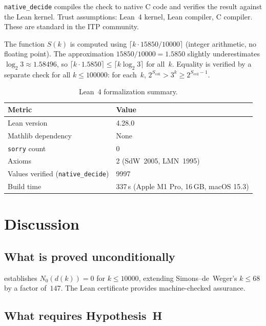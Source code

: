 \documentclass[11pt, a4paper]{amsart}
\theoremstyle{plain}
\theoremstyle{definition}
\theoremstyle{remark}
\begin{document}
\texttt{native\_decide} compiles the check to native C code
and verifies the result against the Lean kernel.
Trust assumptions: Lean~4 kernel, Lean compiler, C compiler.
These are standard in the ITP community.

The function $S(k)$ is computed using
$\lceil k \cdot 15850 / 10000 \rceil$ (integer arithmetic,
no floating point).  The approximation
$15850/10000 = 1.5850$ slightly underestimates
$\log_2 3 \approx 1.58496$, so
$\lceil k \cdot 1.5850 \rceil \leq \lceil k \log_2 3 \rceil$
for all~$k$.  Equality is verified by a separate check
for all $k \leq 100000$: for each~$k$,
$2^{S_{\text{ceil}}} > 3^k \geq 2^{S_{\text{ceil}}-1}$.

\begin{table}[ht]
\centering
\caption{Lean~4 formalization summary.}
\label{tab:lean}
\begin{tabular}{ll}
\toprule
Metric & Value \\
\midrule
Lean version & 4.28.0 \\
Mathlib dependency & None \\
\texttt{sorry} count & 0 \\
Axioms & 2 (SdW~2005, LMN~1995) \\
Values verified (\texttt{native\_decide}) & 9997 \\
Build time & 337\,s (Apple M1 Pro, 16\,GB, macOS 15.3) \\
\bottomrule
\end{tabular}
\end{table}

\section{Discussion}\label{sec:discussion}

\subsection{What is proved unconditionally}\label{ssec:unconditional}

 establishes $N_0(d(k)) = 0$ for
$k \leq 10000$, extending Simons--de~Weger's $k \leq 68$
by a factor of~$147$.  The Lean certificate provides
machine-checked assurance.

\subsection{What requires Hypothesis~H}\label{ssec:conditional}
\end{document}
